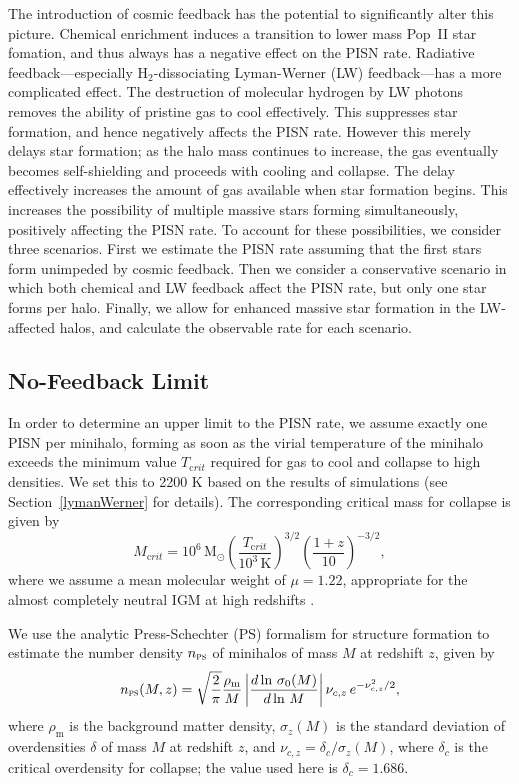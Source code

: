 \documentclass{thesis}
\newcommand{\msun}{\ensuremath{\,\mathrm{M}_{\odot}}\xspace}
\newcommand{\htwo}{\ensuremath{\mathrm{H}_2}\xspace}
\newcommand{\RefSec}[1]{\mbox{Section~\ref{#1}}}
\begin{document}
The introduction of cosmic feedback has the potential to significantly
alter this picture.  Chemical enrichment induces a transition to lower
mass Pop~II star fomation, and thus always has a negative effect on
the PISN rate.  Radiative feedback---especially \htwo-dissociating
Lyman-Werner (LW) feedback---has a more complicated effect.  The
destruction of molecular hydrogen by LW photons removes the ability of
pristine gas to cool effectively. This suppresses star formation, and
hence negatively affects the PISN rate.  However this merely delays
star formation; as the halo mass continues to increase, the gas
eventually becomes self-shielding and proceeds with cooling and
collapse.  The delay effectively increases the amount of gas available
when star formation begins. This increases the possibility of multiple
massive stars forming simultaneously, positively affecting the PISN
rate.  To account for these possibilities, we consider three
scenarios.  First we estimate the PISN rate assuming that the first
stars form unimpeded by cosmic feedback. Then we consider a
conservative scenario in which both chemical and LW feedback affect
the PISN rate, but only one star forms per halo.  Finally, we allow
for enhanced massive star formation in the LW-affected halos, and calculate
the observable rate for each scenario.


\subsection{No-Feedback Limit}
In order to determine an upper limit to the PISN rate, we assume
exactly one PISN per minihalo, forming as soon as the virial
temperature of the minihalo exceeds the minimum value $T_{\mathrm crit}$
required for gas to cool and collapse to high densities. We set this
to 2200 K based on the results of simulations (see
\RefSec{lymanWerner} for details).  The corresponding critical mass
for collapse is given by
\begin{equation}
  \label{mcriteq}
    M_{\mathrm crit} = 10^6\msun
    \left( \frac{T_{\mathrm crit}}{10^3 \,{\mathrm K}}\right)^{3/2} 
   \left( \frac{1+z}{10}\right)^{-3/2},
\end{equation}
where we assume a mean molecular weight of $\mu=1.22$, appropriate for
the almost completely neutral IGM at high redshifts
\citep{BarkanaLoeb2001}.

We use the analytic Press-Schechter (PS) formalism for structure
formation \citep{PressSchechter1974} to estimate the number density
$n_{\textsc{ps}}$ of minihalos of mass $M$ at redshift $z$, given by
\begin{equation}
n_{\textsc{ps}} (M,z) = \sqrt{\frac{2}{\pi}}
\frac{\rho_{\mathrm m}}{M}\left|\frac{d\ln \,\sigma_{0}(M)}{d\ln \,M}
\right|\nu_{c,z} \,e^{-\nu_{c,z}^2 /2},
\end{equation}
where $\rho_{\mathrm m}$ is the background matter density, $\sigma_{z}(M)$
is the standard deviation of overdensities $\delta$ of mass $M$ at
redshift $z$, and $\nu_{c,z} = \delta_c / \sigma_{z}(M)$, where
$\delta_c$ is the critical overdensity for collapse; the value used
here is $\delta_c =1.686$.
\end{document}
